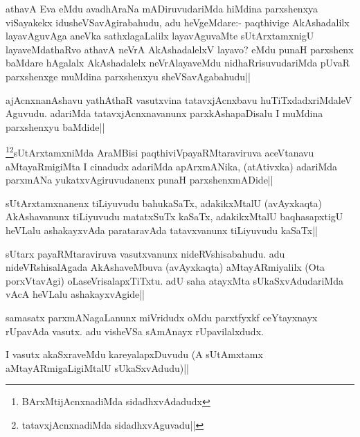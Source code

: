 \begin{artha}%
athavA Eva eMdu avadhAraNa mADiruvudariMda hiMdina parxshenxya viSayakekx idusheVSavAgirabahudu, adu heVgeMdare:- paqthivige AkAshadalilx layavAguvAga aneVka sathxlagaLalilx layavAguvaMte sUtArxtamxnigU layaveMdathaRvo athavA neVrA AkAshadalelxV layavo? eMdu punaH parxshenx baMdare hAgalalx AkAshadalelx neVrAlayaveMdu nidhaRrisuvudariMda pUvaR parxshenxge muMdina parxshenxyu sheVSavAgabahudu||
\end{artha}

\begin{artha}
ajAcnxnanAshavu yathAthaR vasutxvina tatavxjAcnxbavu huTiTxdadxriMdaleV Aguvudu. adariMda tatavxjAcnxnavanunx parxkAshapaDisalu I muMdina parxshenxyu baMdide||
\end{artha}

\begin{artha}
\footnote[1]{BArxMtijAcnxnadiMda sidadhxvAdadudx}\footnote[2]{tatavxjAcnxnadiMda sidadhxvAguvadu||}sUtArxtamxniMda AraMBisi paqthiviVpayaRMtaraviruva aceVtanavu aMtayaRmigiMta I cinadudx adariMda apArxmANika, (atAtivxka) adariMda parxmANa yukatxvAgiruvudanenx punaH parxshenxmADide||
\end{artha}


\begin{artha}
sUtArxtamxnanenx tiLiyuvudu bahukaSaTx, adakikxMtalU (avAyxkaqta) AkAshavanunx tiLiyuvudu matatxSuTx kaSaTx, adakikxMtalU baqhasapxtigU heVLalu ashakayxvAda parataravAda tatavxvanunx tiLiyuvudu kaSaTx||
\end{artha}


\begin{artha}
sUtarx payaRMtaraviruva vasutxvanunx nideRVshisabahudu. adu nideVRshisalAgada AkAshaveMbuva (avAyxkaqta) aMtayARmiyalilx (Ota porxVtavAgi) oLaseVrisalapxTiTxtu. adU saha atayxMta sUkaSxvAdudariMda vAcA heVLalu ashakayxvAgide||
\end{artha}


\begin{artha}
samasatx parxmANagaLanunx miVridudx oMdu parxtfyxkf ceYtayxnayx rUpavAda vasutx. adu visheVSa sAmAnayx rUpavilalxdudx.

I vasutx akaSxraveMdu kareyalapxDuvudu (A sUtAmxtamx aMtayARmigaLigiMtalU sUkaSxvAdudu)||
\end{artha}

